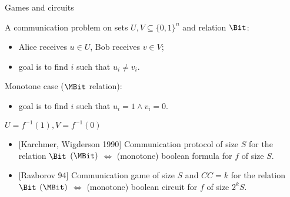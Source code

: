 \begin{frame}{Games and circuits}

    A communication problem on sets $U, V \subseteq \{0, 1\}^{n}$ and relation $\Bit$:
    \begin{itemize}
        \item Alice receives $u \in U$, Bob receives $v \in V$;
        \item goal is to find $i$ such that $u_i \neq v_i$.
    \end{itemize}
    \pause
    Monotone case ($\MBit$ relation):
    \begin{itemize}
        \item goal is to find $i$ such that $u_i = 1 \land v_i = 0$.
    \end{itemize}

    \pause

    \vspace{0.2cm}
    $U = f^{-1}(1), V = f^{-1}(0)$

    \begin{itemize}
        \item {[Karchmer, Wigderson 1990]} Communication protocol of size $S$ for the relation $\Bit$
            \alert{$(\MBit)$} $\Leftrightarrow$ \alert{(monotone)} boolean formula for $f$ of size $S$.
        \pause
        \item {[Razborov 94]} Communication game of size $S$ and $CC = k$ for the relation $\Bit$
            \alert{$(\MBit)$} $\Leftrightarrow$ \alert{(monotone)} boolean circuit for $f$ of size $2^k
            S$.
    \end{itemize}
\end{frame}

